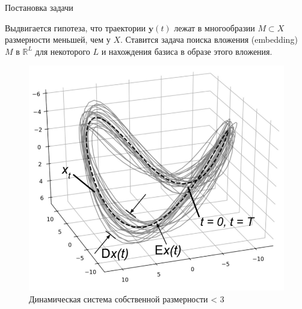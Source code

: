 	\begin{frame}{Постановка задачи}
		
		Выдвигается гипотеза, что траектории $ \textbf{y}(t) $ лежат в многообразии $ M \subset X $ размерности  меньшей, чем у $ X $. Ставится задача поиска вложения (embedding) $ M $ в $ \mathbb{R}^{L} $ для некоторого $ L $ и нахождения базиса в образе этого вложения.
		
		\begin{figure}[h]
			\centering
			
			\includegraphics[width=0.6\textheight, keepaspectratio]{img/dynamic_system_example.png}
			\caption{Динамическая система собственной размерности < 3}
			
		\end{figure}
		
	\end{frame}
	
